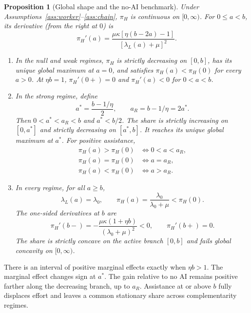 \documentclass[11pt]{article}
\newtheorem{proposition}{Proposition}
\theoremstyle{definition}
\newcommand{\lam}{\lambda_L}
\newcommand{\share}{\pi_H}
\newcommand{\peak}{a^*}
\newcommand{\ret}{a_R}
\begin{document}
\begin{proposition}[Global shape and the no-AI benchmark]\label{prop:shape}
Under Assumptions~\ref{ass:worker}--\ref{ass:chain}, $\share$ is continuous
on $[0,\infty)$. For $0\leq a<b$, its derivative (from the right at $0$) is
\begin{equation}\label{eq:derivative}
 \share'(a)=\frac{\mu\kappa[\eta(b-2a)-1]}{[\lam(a)+\mu]^2}.
\end{equation}
\begin{enumerate}
 \item In the null and weak regimes, $\share$ is strictly decreasing on
 $[0,b]$, has its unique global maximum at $a=0$, and satisfies
 $\share(a)<\share(0)$ for every $a>0$. At $\eta b=1$,
 $\share'(0+)=0$ and $\share'(a)<0$ for $0<a<b$.
 \item In the strong regime, define
 \begin{equation}\label{eq:thresholds}
  \peak=\frac{b-1/\eta}{2},\qquad \ret=b-1/\eta=2\peak .
 \end{equation}
 Then $0<\peak<\ret<b$ and $\peak<b/2$. The share is strictly increasing
 on $[0,\peak]$ and strictly decreasing on $[\peak,b]$. It reaches its
 unique global maximum at $\peak$. For positive assistance,
 \begin{equation}\label{eq:baseline}
  \begin{aligned}
   \share(a)>\share(0)&\iff 0<a<\ret,\\
   \share(a)=\share(0)&\iff a=\ret,\\
   \share(a)<\share(0)&\iff a>\ret .
  \end{aligned}
 \end{equation}
 \item In every regime, for all $a\geq b$,
 \begin{equation}\label{eq:plateau}
  \lam(a)=\lambda_0,\qquad
  \share(a)=\frac{\lambda_0}{\lambda_0+\mu}<\share(0).
 \end{equation}
 The one-sided derivatives at $b$ are
 \begin{equation}\label{eq:kink}
  \share'(b-)=-\frac{\mu\kappa(1+\eta b)}{(\lambda_0+\mu)^2}<0,\qquad
  \share'(b+)=0.
 \end{equation}
 The share is strictly concave on the active branch $[0,b]$ and fails
 global concavity on $[0,\infty)$.
\end{enumerate}
\end{proposition}

There is an interval of positive marginal effects exactly when $\eta b>1$.
The marginal effect changes sign at $\peak$. The gain relative to no AI
remains positive farther along the decreasing branch, up to $\ret$.
Assistance at or above $b$ fully displaces effort and leaves a common
stationary share across complementarity regimes.
\end{document}

